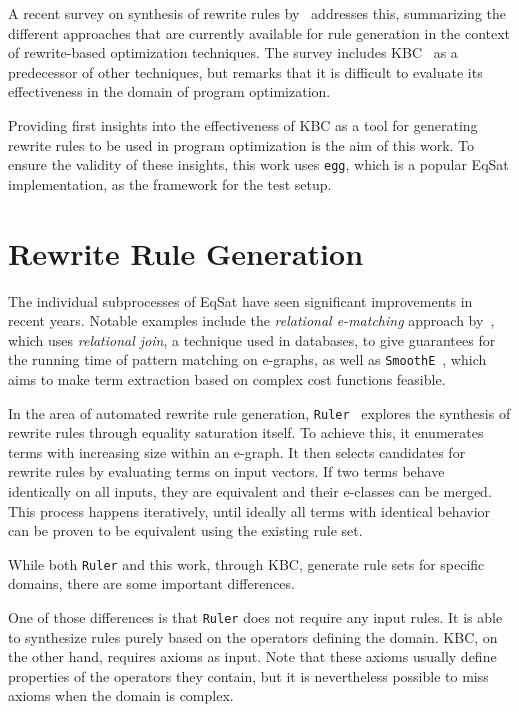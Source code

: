 A recent survey on synthesis of rewrite rules by~\cite{Hong_2024} addresses this, summarizing the different approaches that are currently available for rule generation in the context of rewrite-based optimization techniques. The survey includes KBC~\citep{10.1093/comjnl/34.1.2} as a predecessor of other techniques, but remarks that it is difficult to evaluate its effectiveness in the domain of program optimization. 

Providing first insights into the effectiveness of KBC as a tool for generating rewrite rules to be used in program optimization is the aim of this work. To ensure the validity of these insights, this work uses \texttt{egg}, which is a popular EqSat implementation, as the framework for the test setup. 

\section{Rewrite Rule Generation}
The individual subprocesses of EqSat have seen significant improvements in recent years. Notable examples include the \emph{relational e-matching} approach by~\cite{Willsey_2022}, which uses \emph{relational join}, a technique used in databases, to give guarantees for the running time of pattern matching on e-graphs, as well as \texttt{SmoothE}~\citep{SmoothE}, which aims to make term extraction based on complex cost functions feasible. 

In the area of automated rewrite rule generation, \texttt{Ruler}~\citep{Ruler} explores the synthesis of rewrite rules through equality saturation itself. To achieve this, it enumerates terms with increasing size within an e-graph. It then selects candidates for rewrite rules by evaluating terms on input vectors. If two terms behave identically on all inputs, they are equivalent and their e-classes can be merged. This process happens iteratively, until ideally all terms with identical behavior can be proven to be equivalent using the existing rule set.

While both \texttt{Ruler} and this work, through KBC, generate rule sets for specific domains, there are some important differences.

One of those differences is that \texttt{Ruler} does not require any input rules. It is able to synthesize rules purely based on the operators defining the domain. KBC, on the other hand, requires axioms as input. Note that these axioms usually define properties of the operators they contain, but it is nevertheless possible to miss axioms when the domain is complex.

